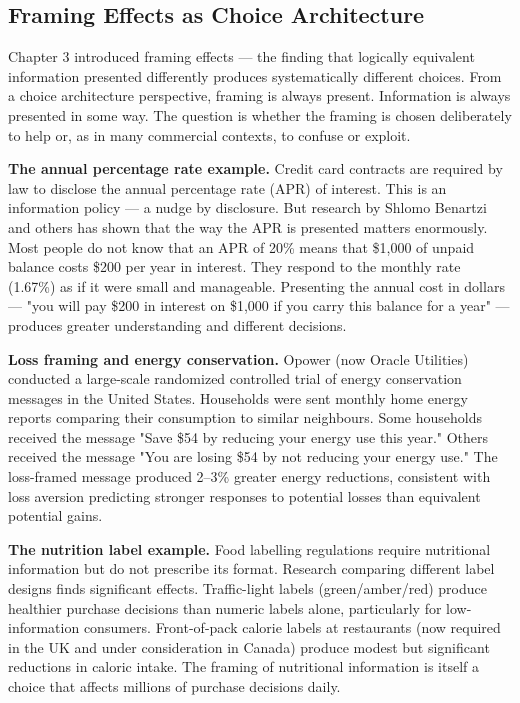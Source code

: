 \documentclass[12pt, letterpaper]{article}
\begin{document}
\subsection{Framing Effects as Choice Architecture}


Chapter 3 introduced framing effects --- the finding that logically equivalent information presented differently produces systematically different choices. From a choice architecture perspective, framing is always present. Information is always presented in some way. The question is whether the framing is chosen deliberately to help or, as in many commercial contexts, to confuse or exploit.

\textbf{The annual percentage rate example.} Credit card contracts are required by law to disclose the annual percentage rate (APR) of interest. This is an information policy --- a nudge by disclosure. But research by Shlomo Benartzi and others has shown that the way the APR is presented matters enormously. Most people do not know that an APR of 20\% means that \$1,000 of unpaid balance costs \$200 per year in interest. They respond to the monthly rate (1.67\%) as if it were small and manageable. Presenting the annual cost in dollars --- "you will pay \$200 in interest on \$1,000 if you carry this balance for a year" --- produces greater understanding and different decisions.

\textbf{Loss framing and energy conservation.} Opower (now Oracle Utilities) conducted a large-scale randomized controlled trial of energy conservation messages in the United States. Households were sent monthly home energy reports comparing their consumption to similar neighbours. Some households received the message "Save \$54 by reducing your energy use this year." Others received the message "You are losing \$54 by not reducing your energy use." The loss-framed message produced 2--3\% greater energy reductions, consistent with loss aversion predicting stronger responses to potential losses than equivalent potential gains.

\textbf{The nutrition label example.} Food labelling regulations require nutritional information but do not prescribe its format. Research comparing different label designs finds significant effects. Traffic-light labels (green/amber/red) produce healthier purchase decisions than numeric labels alone, particularly for low-information consumers. Front-of-pack calorie labels at restaurants (now required in the UK and under consideration in Canada) produce modest but significant reductions in caloric intake. The framing of nutritional information is itself a choice that affects millions of purchase decisions daily.
\end{document}

